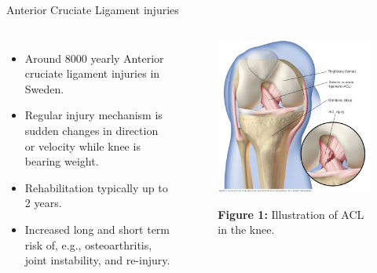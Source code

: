 \begin{frame}[fragile]{Anterior Cruciate Ligament injuries}
  \begin{columns}[c,onlytextwidth]
      \begin{itemize}
          \item Around 8000 yearly Anterior cruciate ligament injuries in Sweden.
          \item Regular injury mechanism is sudden changes in direction or velocity while knee is bearing weight.
          \item Rehabilitation typically up to 2 years.
          \item Increased long and short term risk of, e.g., osteoarthritis, joint instability, and re-injury.
      \end{itemize}

    \begin{figure}
      \centering
      \includegraphics[width=\textwidth]{files/figs/intro/acl.png}

      {\scriptsize\textbf{Figure 1:} Illustration of ACL in the knee\footnotemark.}
    \end{figure}

  \end{columns}

\end{frame}

